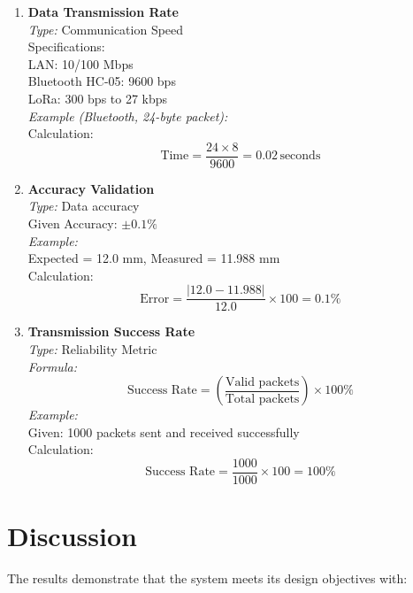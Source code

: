 \documentclass[12pt]{report}
\begin{document}
\begin{enumerate}
    \item \textbf{Data Transmission Rate} \\
    \textit{Type:} Communication Speed \\
    Specifications: \\
    LAN: 10/100 Mbps \\
    Bluetooth HC-05: 9600 bps \\
    LoRa: 300 bps to 27 kbps \\
    \textit{Example (Bluetooth, 24-byte packet):} \\
    Calculation: 
    \[
    \text{Time} = \frac{24 \times 8}{9600} = 0.02\, \text{seconds}
    \]

    \item \textbf{Accuracy Validation} \\
    \textit{Type:} Data accuracy \\
    Given Accuracy: \(\pm 0.1\%\) \\
    \textit{Example:} \\
    Expected = 12.0 mm, Measured = 11.988 mm \\
    Calculation: 
    \[
    \text{Error} = \frac{|12.0 - 11.988|}{12.0} \times 100 = 0.1\%
    \]

    \item \textbf{Transmission Success Rate} \\
    \textit{Type:} Reliability Metric \\
    \textit{Formula:} 
    \[
    \text{Success Rate} = \left(\frac{\text{Valid packets}}{\text{Total packets}}\right) \times 100\%
    \]
    \textit{Example:} \\
    Given: 1000 packets sent and received successfully \\
    Calculation: 
    \[
    \text{Success Rate} = \frac{1000}{1000} \times 100 = 100\%
    \]
\end{enumerate}

\section{Discussion}
The results demonstrate that the system meets its design objectives with:
\end{document}
